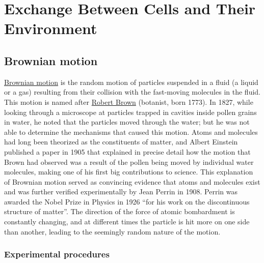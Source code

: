 \chapter{Exchange Between Cells and Their
Environment}\label{exchange-between-cells-and-their-environment}

\section{Brownian motion}\label{brownian-motion}

\href{https://en.wikipedia.org/wiki/Brownian_motion}{Brownian motion} is
the random motion of particles suspended in a fluid (a liquid or a gas)
resulting from their collision with the fast-moving molecules in the
fluid. This motion is named after
\href{https://en.wikipedia.org/wiki/Robert_Brown_(botanist,_born_1773)}{Robert
Brown} (botanist, born 1773). In 1827, while looking through a
microscope at particles trapped in cavities inside pollen grains in
water, he noted that the particles moved through the water; but he was
not able to determine the mechanisms that caused this motion. Atoms and
molecules had long been theorized as the constituents of matter, and
Albert Einstein published a paper in 1905 that explained in precise
detail how the motion that Brown had observed was a result of the pollen
being moved by individual water molecules, making one of his first big
contributions to science. This explanation of Brownian motion served as
convincing evidence that atoms and molecules exist and was further
verified experimentally by Jean Perrin in 1908. Perrin was awarded the
Nobel Prize in Physics in 1926 ``for his work on the discontinuous
structure of matter''. The direction of the force of atomic bombardment
is constantly changing, and at different times the particle is hit more
on one side than another, leading to the seemingly random nature of the
motion.

\subsection{Experimental procedures}\label{experimental-procedures-13}

